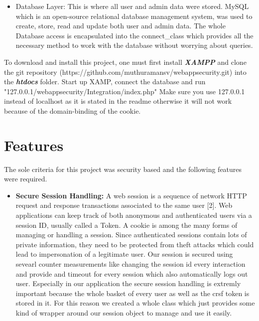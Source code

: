 \documentclass[12pt,a4paper]{article}
\begin{document}
\begin{flushleft}
\begin{itemize}
		\item Database Layer: This is where all user and admin data were stored. MySQL which is an open-source relational database management system, was used to create, store, read and update both user and admin data. The whole Database access is encapsulated into the connect_class which provides all the necessary method to work with the database without worrying about queries.
	\end{itemize}
	To download and install this project, one must first install \textbf{\textit{XAMPP}} and clone the git repository (https://github.com/muthuramansv/webappsecurity.git) into the \textbf{\textit{htdocs}} folder. Start up XAMP, connect the database and run "127.0.0.1/webappsecurity/Integration/index.php" Make sure you use 127.0.0.1 instead of localhost as it is stated in the readme otherwise it will not work because of the domain-binding of the cookie.
	
	
	
	\section{Features}
	The sole criteria for this project was security based and the following features were required.
	\begin{itemize}
		\item \textbf{Secure Session Handling:} A web session is a sequence of network HTTP request and response transactions associated to the same user [2]. 
		Web applications can keep track of both anonymous and authenticated users via a session ID, usually called a Token. A cookie is among the many forms of managing or handling a session. Since authenticated sessions contain lots of private information, they need to be protected from theft attacks which could lead to impersonation of a legitimate user. Our session is secured using sevearl counter measurements like changing the session id every interaction and provide and timeout for every session which also automatically logs out user. Especially in our application the secure session handling is extremly important because the whole basket of every user as well as the crsf token is stored in it. For this reason we created a whole class which just provides some kind of wrapper around our session object to manage and use it easily.
		

\end{itemize}
\end{flushleft}
\end{document}
